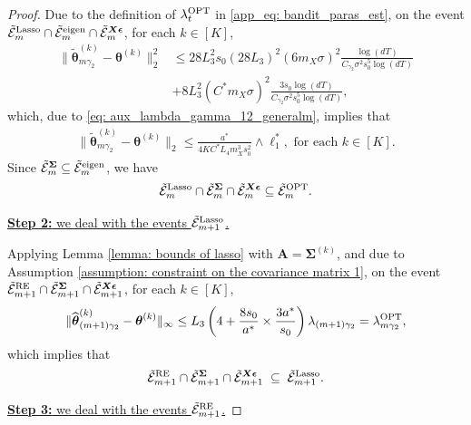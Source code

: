 \documentclass[aos,preprint]{imsart}
\theoremstyle{plain}
\theoremstyle{definition}
\newcommand{\btheta}{\boldsymbol{\theta}}
\newcommand{\bd}[1]{\boldsymbol{#1}}
\newcommand{\hbtheta}{\widehat{\boldsymbol{\theta}}}
\newcommand{\bX}{\boldsymbol{X}}
\newcommand{\bSigma}{\boldsymbol{\Sigma}}
\newcommand{\tbtheta}{\widetilde{\boldsymbol{\theta}}}
\newcommand{\bA}{\boldsymbol{A}}
\newcommand{\hdlambda}{\lambda^{\textup{OPT}}}
\newcommand{\mE}{\mathcal{E}}
\newcommand{\bepsilon}{\bd{\epsilon}}
\begin{document}
\begin{appendix}
\begin{proof}
Due to the definition of $\hdlambda_t$ in \eqref{app_eq: bandit_paras_est}, on the event $\tilde{\mE}_{m}^{\textup{Lasso}} \cap \tilde{\mE}_{m}^{\textup{eigen}} \cap \tilde{\mE}_{m}^{\bX\bepsilon}$, for each $k \in [K]$,
\begin{align*}
    \|\tbtheta_{m\gamma_2}^{(k)}-\btheta^{(k)}\|_2^2 &\leq 28L_3^2 s_0 (28L_3)^2 (6m_X \sigma)^2 \frac{\log(dT)}{C_{\gamma_2} \sigma^2 s_0^5  \log(dT)}  \\
    &+ 8L_3^2  (C^* m_X \sigma)^2 \frac{3s_0\log(dT)}{ C_{\gamma_2} \sigma^2 s_0^5  \log(dT)},
 \end{align*}
 which, due to \eqref{eq: aux_lambda_gamma_12_generalm}, implies that
 \begin{align*}
    \|\tbtheta_{m\gamma_2}^{(k)}-\btheta^{(k)}\|_2  \leq  \frac{a^*}{4KC^*L_4 m_X^3 s_0^2} \wedge  \ell_1^*, \text{ for each } k \in[K].
 \end{align*}
 Since $\tilde{\mE}_{m}^{\bSigma} \subseteq \tilde{\mE}_{m}^{\textup{eigen}}$, we have
\begin{align}\label{aux:stage3_OPT}
   \tilde{\mE}_{m}^{\textup{Lasso}} \cap \tilde{\mE}_{m}^{\bSigma}  \cap \tilde{\mE}_{m}^{\bX\bepsilon} \subseteq \tilde{\mE}_{m}^{\textup{OPT}}.
\end{align}

\medskip


\noindent \underline{\textbf{Step 2:} we deal with the events 
$\tilde{\mE}_{m+1}^{\textup{Lasso}}$.} 



Applying Lemma \ref{lemma: bounds of lasso}
with $\bA = \bSigma^{(k)}$, and due to Assumption \ref{assumption: constraint on the covariance matrix 1}, on the event $\tilde{\mE}_{m+1}^{\textup{RE}} \cap \tilde{\mE}_{m+1}^{\bSigma} \cap \tilde{\mE}_{m+1}^{\bX\bepsilon}$, for each $k \in [K]$,
$$
\|\hbtheta_{(m+1)\gamma_2}^{(k)} - \btheta^{(k)}\|_{\infty} \leq L_3\left(4 + \frac{8s_0}{a^*}  \times \frac{3a^*}{s_0}  \right) \lambda_{(m+1)\gamma_2} = \hdlambda_{m\gamma_2},
$$
which implies that
\begin{align}
    \label{aux:stage3_Lasso_event}
\tilde{\mE}_{m+1}^{\textup{RE}} \cap \tilde{\mE}_{m+1}^{\bSigma} \cap \tilde{\mE}_{m+1}^{\bX\bepsilon} \; \subseteq \;
      \tilde{\mE}_{m+1}^{\textup{Lasso}}.
\end{align}





\medskip
\noindent \underline{\textbf{Step 3:} we deal with the events 
$\tilde{\mE}_{m+1}^{\textup{RE}}$.} 


\end{proof}
\end{appendix}
\end{document}
